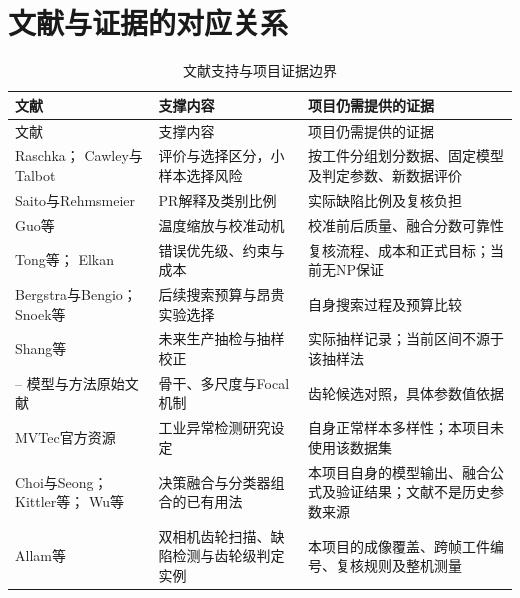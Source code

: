 \FloatBarrier{}\section{文献与证据的对应关系}

\begingroup\small{}
\begin{longtable}{@{}>{\raggedright\arraybackslash}p{0.240\dimexpr\linewidth-4\tabcolsep\relax}>{\raggedright\arraybackslash}p{0.340\dimexpr\linewidth-4\tabcolsep\relax}>{\raggedright\arraybackslash}p{0.420\dimexpr\linewidth-4\tabcolsep\relax}@{}}
\caption{文献支持与项目证据边界}\\
\toprule
文献 & 支撑内容 & 项目仍需提供的证据 \\
\midrule\endfirsthead
\toprule
文献 & 支撑内容 & 项目仍需提供的证据 \\
\midrule\endhead
\midrule\multicolumn{3}{r}{\footnotesize 续下页}\endfoot
\bottomrule\endlastfoot
\cite{ref1} Raschka；\cite{ref2} Cawley与Talbot & 评价与选择区分，小样本选择风险 & 按工件分组划分数据、固定模型及判定参数、新数据评价 \\
\cite{ref3} Saito与Rehmsmeier & PR解释及类别比例 & 实际缺陷比例及复核负担 \\
\cite{ref4} Guo等 & 温度缩放与校准动机 & 校准前后质量、融合分数可靠性 \\
\cite{ref5} Tong等；\cite{ref6} Elkan & 错误优先级、约束与成本 & 复核流程、成本和正式目标；当前无NP保证 \\
\cite{ref7} Bergstra与Bengio；\cite{ref8} Snoek等 & 后续搜索预算与昂贵实验选择 & 自身搜索过程及预算比较 \\
\cite{ref9} Shang等 & 未来生产抽检与抽样校正 & 实际抽样记录；当前区间不源于该抽样法 \\
\cite{ref10}--\cite{ref13} 模型与方法原始文献 & 骨干、多尺度与Focal机制 & 齿轮候选对照，具体参数值依据 \\
\cite{ref14} MVTec官方资源 & 工业异常检测研究设定 & 自身正常样本多样性；本项目未使用该数据集 \\
\cite{ref15} Choi与Seong；\cite{ref16} Kittler等；\cite{ref17} Wu等 & 决策融合与分类器组合的已有用法 & 本项目自身的模型输出、融合公式及验证结果；文献不是历史参数来源 \\
\cite{ref18} Allam等 & 双相机齿轮扫描、缺陷检测与齿轮级判定实例 & 本项目的成像覆盖、跨帧工件编号、复核规则及整机测量 \\
\end{longtable}\endgroup


